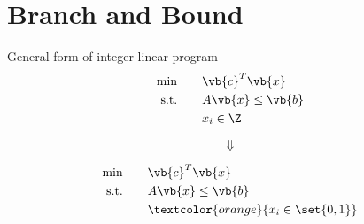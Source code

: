 \documentclass[aspectratio=169, handout]{beamer}
\begin{document}
\section{Branch and Bound}
\frame{\tableofcontents[currentsection]}

\begin{frame}{General form of integer linear program}
    \begin{align*}
        \min \qquad        & \vb{c}^T \vb{x}     \\
        \text{s.t.} \qquad & A \vb{x} \le \vb{b} \\
                           & x_i \in \Z
    \end{align*}

    \pause

    \vspace{-\baselineskip}
    $$
        \Downarrow
    $$
    \vspace{-2\baselineskip}

    \begin{align*}
        \min \qquad        & \vb{c}^T \vb{x}                       \\
        \text{s.t.} \qquad & A \vb{x} \le \vb{b}                   \\
                           & \textcolor{orange}{x_i \in \set{0,1}}
    \end{align*}
\end{frame}
\end{document}
